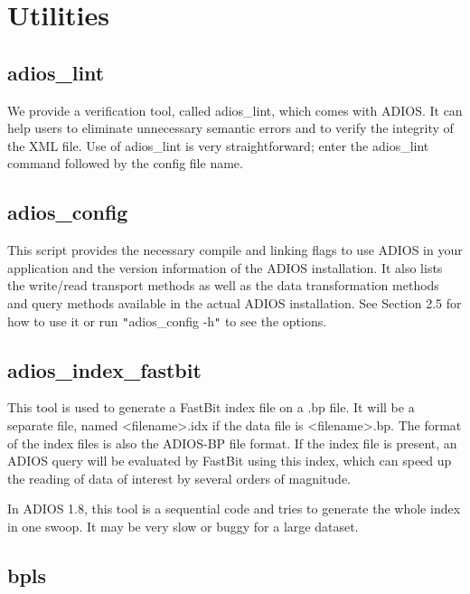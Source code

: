 \chapter{Utilities}

\section{adios\_lint}

We provide a verification tool, called adios\_lint, which comes with ADIOS. It 
can help users to eliminate unnecessary semantic errors and to verify the integrity 
of the XML file. Use of adios\_lint is very straightforward; enter the adios\_lint 
command followed by the config file name.

\section{adios\_config}

This script provides the necessary compile and linking flags to use ADIOS in your 
application and the version information of the ADIOS installation. It also 
lists the write/read transport methods as well as the data transformation methods
and query methods available in the actual ADIOS installation. See Section 
2.5 for how to use it or run \texttt{"}adios\_config -h\texttt{"} to see the options. 

\section{adios\_index\_fastbit}

This tool is used to generate a FastBit index file on a .bp file. It will be a separate file, named 
<filename>.idx if the data file is <filename>.bp. The format of the index files is also the 
ADIOS-BP file format. If the index file is present, an ADIOS query will be evaluated by FastBit using this index, which can speed up the reading of data of interest by several orders of magnitude.

\vspace{6pt}
 In ADIOS 1.8, this tool is a sequential code and tries to generate the whole index in one swoop. It may be very slow or buggy for a large dataset.


\section{bpls}

